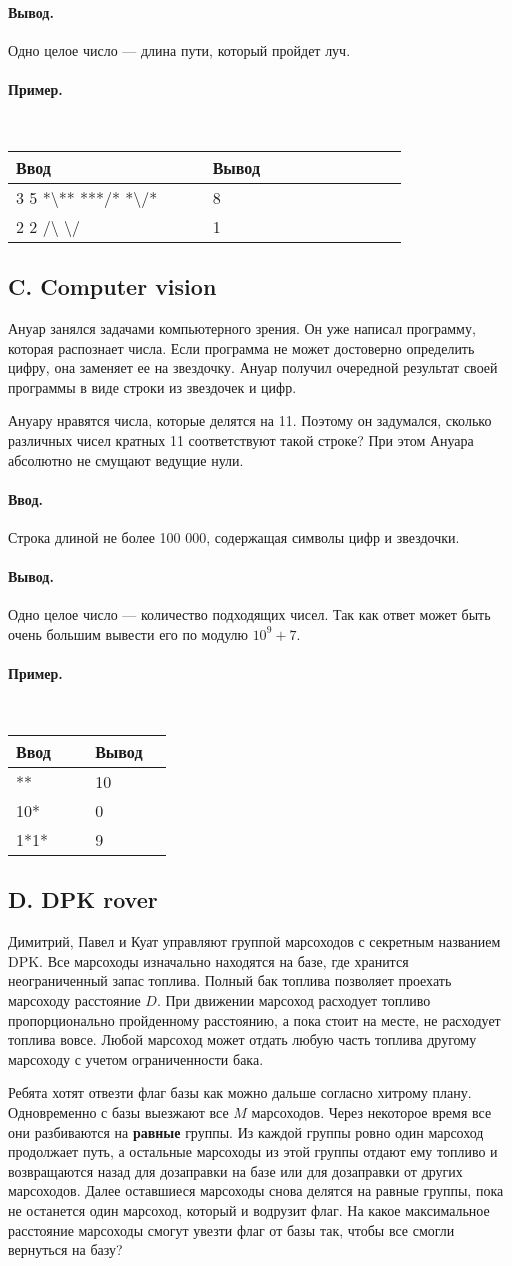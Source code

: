 \documentclass[12pt, a4paper]{article}
\newcommand{\informat}[1]
{
	\paragraph{Ввод.\\} #1
}
\newcommand{\outformat}[1]
{
	\paragraph{Вывод.\\} #1
}
\newcommand{\examplee}[4]
{
	\paragraph{Пример.\\}
	{\tt
	\begin{tabular}{|p{0.4\linewidth}|p{0.4\linewidth}|}
	\hline
	Ввод 	& Вывод  	\\
	\hline
	#1 		& #2 		\\
	\hline
	#3		& #4		\\
	\hline
	\end{tabular}
	}
}
\newcommand{\exampleee}[6]
{
	\paragraph{Пример.\\}
	{\tt
	\begin{tabular}{|p{0.4\linewidth}|p{0.4\linewidth}|}
	\hline
	Ввод 	& Вывод  	\\
	\hline
	#1 		& #2 		\\
	\hline
	#3		& #4		\\
	\hline
	#5		& #6		\\
	\hline
	\end{tabular}
	}
}
\begin{document}
\outformat{Одно целое число --- длина пути, который пройдет луч.}

\examplee
{
3 5 \newline
*\textbackslash***\newline
***/*\newline
*\textbackslash*/*
}
{8}
{
2 2 \newline
/\textbackslash \newline
\textbackslash/}
{1}




\subsection*{C. Computer vision}
 

Ануар занялся задачами компьютерного зрения. Он уже написал программу, которая распознает числа. Если программа не может достоверно определить цифру, она заменяет ее на звездочку. Ануар получил очередной результат своей программы в виде строки из звездочек и цифр. 

Ануару нравятся числа, которые делятся на 11. Поэтому он задумался, сколько различных чисел кратных 11 соответствуют такой строке? При этом Ануара абсолютно не смущают ведущие нули.

\informat{Строка длиной не более 100 000, содержащая символы цифр и звездочки.}

\outformat{Одно целое число --- количество подходящих чисел. Так как ответ может быть очень большим вывести его по модулю $10^9+7$.}

\exampleee{**}{10}{10*}{0}{1*1*}{9}




\subsection*{D. DPK rover}
 

Димитрий, Павел и Куат управляют группой марсоходов с секретным названием DPK. Все марсоходы изначально находятся на базе, где хранится неограниченный запас топлива. Полный бак топлива позволяет проехать марсоходу расстояние $D$. При движении марсоход расходует топливо пропорционально пройденному расстоянию, а пока стоит на месте, не расходует топлива вовсе. Любой марсоход может отдать любую часть топлива другому марсоходу с учетом ограниченности бака.

Ребята хотят отвезти флаг базы как можно дальше согласно хитрому плану. Одновременно с базы выезжают все $M$ марсоходов. Через некоторое время все они разбиваются на \textbf{равные} группы. Из каждой группы ровно один марсоход продолжает путь, а остальные марсоходы из этой группы отдают ему топливо и возвращаются назад для дозаправки на базе или для дозаправки от других марсоходов. Далее оставшиеся марсоходы снова делятся на равные группы, пока не останется один марсоход, который и водрузит флаг. На какое максимальное расстояние марсоходы смогут увезти флаг от базы так, чтобы все смогли вернуться на базу?
\end{document}
